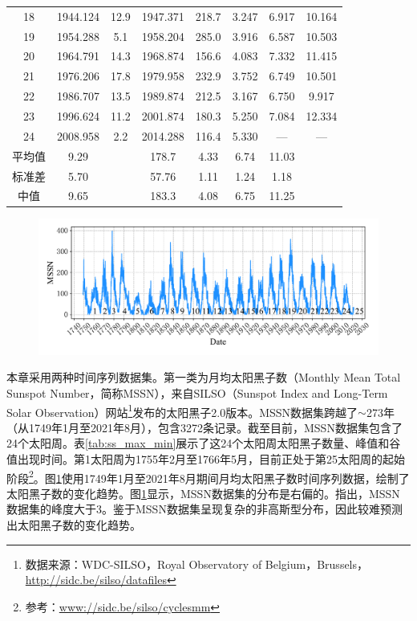 \begin{table}[!htbp]
\begin{tabular}{cccccccc}
    18 & 1944.124 & 12.9 & 1947.371 & 218.7 & 3.247 & 6.917 & 10.164 \\
    19 & 1954.288 & 5.1 & 1958.204 & 285.0 & 3.916 & 6.587 & 10.503 \\
    20 & 1964.791 & 14.3 & 1968.874 & 156.6 & 4.083 & 7.332 & 11.415 \\
    21 & 1976.206 & 17.8 & 1979.958 & 232.9 & 3.752 & 6.749 & 10.501 \\
    22 & 1986.707 & 13.5 & 1989.874 & 212.5 & 3.167 & 6.750 & 9.917 \\
    23 & 1996.624 & 11.2 & 2001.874 & 180.3 & 5.250 & 7.084 & 12.334  \\
    24 & 2008.958 & 2.2 & 2014.288 & 116.4 & 5.330 & — & —  \\
    平均值 & 9.29 &  & 178.7 & 4.33 & 6.74 & 11.03  \\
    标准差 & 5.70 &  & 57.76 & 1.11 & 1.24 & 1.18 \\
    中值 & 9.65 &  & 183.3 & 4.08 & 6.75 & 11.25 \\
    \bottomrule
  \end{tabular}
\end{table}

\begin{figure}[!htbp]
  \centering
  \includegraphics[width=\textwidth]{Img/chap3_ss/ss_number_series.pdf}
  \vspace{-1.4cm}
  \label{fig:ss_number_series}
\end{figure}

本章采用两种时间序列数据集。第一类为月均太阳黑子数（Monthly Mean Total Sunspot Number，简称MSSN），来自SILSO（Sunspot Index and Long-Term Solar Observation）网站\footnote{数据来源：WDC-SILSO，Royal Observatory of Belgium，Brussels，\href{http://sidc.be/silso/datafiles}{http://sidc.be/silso/datafiles}}发布的太阳黑子2.0版本。MSSN数据集跨越了$\sim$273年（从1749年1月至2021年8月），包含3272条记录。截至目前，MSSN数据集包含了24个太阳周。表\ref{tab:ss_max_min}展示了这24个太阳周太阳黑子数量、峰值和谷值出现时间。第1太阳周为1755年2月至1766年5月，目前正处于第25太阳周的起始阶段\footnote{参考：\href{www://sidc.be/silso/cyclesmm}{www://sidc.be/silso/cyclesmm}}。图\ref{fig:ss_number_series}使用1749年1月至2021年8月期间月均太阳黑子数时间序列数据，绘制了太阳黑子数的变化趋势。图\ref{fig:ss_number_series}显示，MSSN数据集的分布是右偏的。\citet{panigrahi2021forecasting}指出，MSSN数据集的峰度大于3。鉴于MSSN数据集呈现复杂的非高斯型分布，因此较难预测出太阳黑子数的变化趋势。

